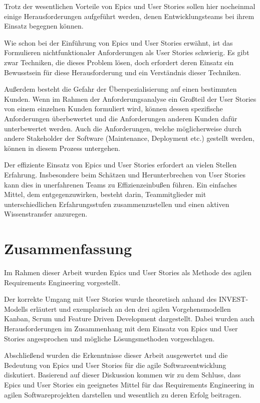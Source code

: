 \documentclass[acmtog]{acmart}
\begin{document}
Trotz der wesentlichen Vorteile von Epics und User Stories sollen hier nocheinmal einige Herausforderungen aufgeführt
werden, denen Entwicklungsteams bei ihrem Einsatz begegnen können.

Wie schon bei der Einführung von Epics und User Stories erwähnt, ist das Formulieren nichtfunktionaler Anforderungen als User Stories
schwierig. Es gibt zwar Techniken, die dieses Problem lösen, doch erfordert deren Einsatz ein Bewusstsein für diese Herausforderung und ein Verständnis dieser Techniken.

Außerdem besteht die Gefahr der Überspezialisierung auf einen bestimmten Kunden.
Wenn im Rahmen der Anforderungsanalyse ein Großteil der User Stories von einem einzelnen Kunden formuliert wird,
können dessen spezifische Anforderungen überbewertet und die Anforderungen anderen Kunden dafür unterbewertet werden.
Auch die Anforderungen, welche möglicherweise durch andere Stakeholder der Software (Maintenance, Deployment etc.) gestellt werden,
können in diesem Prozess untergehen.

Der effiziente Einsatz von Epics und User Stories erfordert an vielen Stellen Erfahrung.
Insbesondere beim Schätzen und Herunterbrechen von User Stories kann dies in unerfahrenen Teams zu Effizienzeinbußen führen. Ein einfaches Mittel, dem entgegenzuwirken, besteht darin, Teammitglieder mit unterschiedlichen
Erfahrungsstufen zusammenzustellen und einen aktiven Wissenstransfer anzuregen.

\section{Zusammenfassung} \label{sec:zusammenfassung}
Im Rahmen dieser Arbeit wurden Epics und User Stories als Methode des agilen Requirements Engineering vorgestellt.

Der korrekte Umgang mit User Stories wurde theoretisch anhand des INVEST-Modells erläutert und exemplarisch
an den drei agilen Vorgehensmodellen Kanban, Scrum und Feature Driven Development dargestellt.
Dabei wurden auch Herausforderungen im Zusammenhang mit dem Einsatz von Epics und User Stories angesprochen und mögliche
Lösungsmethoden vorgeschlagen.

Abschließend wurden die Erkenntnisse dieser Arbeit ausgewertet und die Bedeutung von Epics und User Stories für die agile Softwareentwicklung
diskutiert.
Basierend auf dieser Diskussion kommen wir zu dem Schluss, dass Epics und User Stories ein geeignetes Mittel für das
Requirements Engineering in agilen Softwareprojekten darstellen und wesentlich zu deren Erfolg beitragen.
\end{document}
